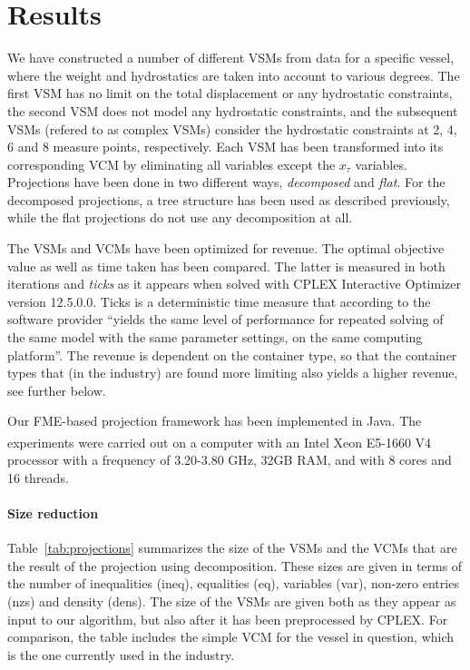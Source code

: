 \documentclass{llncs}
\begin{document}
\section{Results}\label{sec:results}
We have constructed a number of different VSMs from data for a specific vessel, where the weight and hydrostatics are taken into account to various degrees. The first VSM has no limit on the total displacement or any hydrostatic constraints, the second VSM does not model any hydrostatic constraints, and the subsequent VSMs (refered to as complex VSMs) consider the hydrostatic constraints at 2, 4, 6 and 8 measure points, respectively. 
Each VSM has been transformed into its corresponding VCM by eliminating all variables except the $x_\tau$ variables. Projections have been done in two different ways, \emph{decomposed} and \emph{flat}. For the decomposed projections, a tree structure has been used as described previously, while the flat projections do not use any decomposition at all. 

The VSMs and VCMs have been optimized for revenue. The optimal objective value as well as time taken has been compared. The latter is measured in both iterations and \emph{ticks} as it appears when solved with CPLEX Interactive Optimizer version 12.5.0.0. Ticks is a deterministic time measure that according to the software provider ``yields the same level of performance for repeated solving of the same model with the same parameter settings, on the same computing platform''. The revenue is dependent on the container type, so that the container types that (in the industry) are found more limiting also yields a higher revenue, see further below. 

Our FME-based projection framework has been implemented in Java. The experiments were carried out on a computer with an {Intel\textsuperscript{\textregistered} Xeon\textsuperscript{\textregistered} E5-1660 V4 processor with a frequency of 3.20-3.80 GHz, 32GB RAM, and with 8 cores and 16 threads.}

\paragraph{Size reduction}
Table~\ref{tab:projections} summarizes the size of the VSMs and the VCMs that are the result of the projection using decomposition. These sizes are given in terms of the number of inequalities (ineq), equalities (eq), variables (var), non-zero entries (nzs) and density (dens). The size of the VSMs are given both as they appear as input to our algorithm, but also after it has been preprocessed by CPLEX. For comparison, the table includes the simple VCM for the vessel in question, which is the one currently used in the industry. %
\end{document}
